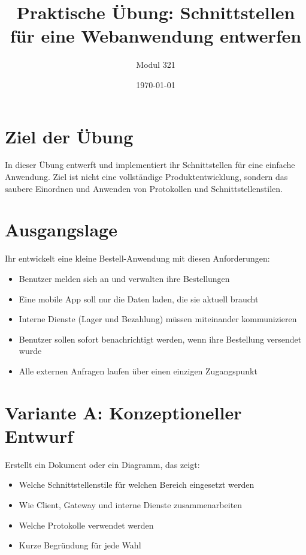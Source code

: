 \documentclass[a4paper,12pt]{article}
\title{Praktische Übung: Schnittstellen für eine Webanwendung entwerfen}
\author{Modul 321}
\date{\today}
\begin{document}
\maketitle

\section*{Ziel der Übung}

In dieser Übung entwerft und implementiert ihr Schnittstellen für eine einfache Anwendung.
Ziel ist nicht eine vollständige Produktentwicklung, sondern das saubere Einordnen
und Anwenden von Protokollen und Schnittstellenstilen.

\section*{Ausgangslage}

Ihr entwickelt eine kleine Bestell-Anwendung mit diesen Anforderungen:

\begin{itemize}
\item Benutzer melden sich an und verwalten ihre Bestellungen
\item Eine mobile App soll nur die Daten laden, die sie aktuell braucht
\item Interne Dienste (Lager und Bezahlung) müssen miteinander kommunizieren
\item Benutzer sollen sofort benachrichtigt werden, wenn ihre Bestellung versendet wurde
\item Alle externen Anfragen laufen über einen einzigen Zugangspunkt
\end{itemize}

\section*{Variante A: Konzeptioneller Entwurf}

Erstellt ein Dokument oder ein Diagramm, das zeigt:

\begin{itemize}
\item Welche Schnittstellenstile für welchen Bereich eingesetzt werden
\item Wie Client, Gateway und interne Dienste zusammenarbeiten
\item Welche Protokolle verwendet werden
\item Kurze Begründung für jede Wahl
\end{itemize}
\end{document}
